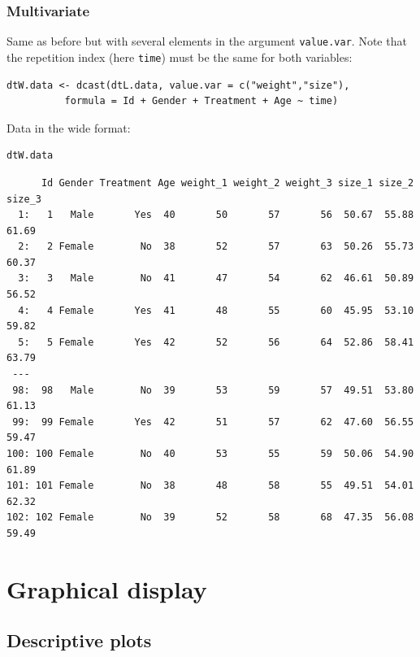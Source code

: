\documentclass{article}
\begin{document}
\clearpage

\subsubsection{Multivariate}
\label{sec:orgd8f36ba}


Same as before but with several elements in the argument
\texttt{value.var}. Note that the repetition index (here \texttt{time}) must be the
same for both variables:
\lstset{language=r,label= ,caption= ,captionpos=b,numbers=none}
\begin{lstlisting}
dtW.data <- dcast(dtL.data, value.var = c("weight","size"),
		  formula = Id + Gender + Treatment + Age ~ time)
\end{lstlisting}

Data in the wide format:
\lstset{language=r,label= ,caption= ,captionpos=b,numbers=none}
\begin{lstlisting}
dtW.data
\end{lstlisting}

\begin{verbatim}
      Id Gender Treatment Age weight_1 weight_2 weight_3 size_1 size_2 size_3
  1:   1   Male       Yes  40       50       57       56  50.67  55.88  61.69
  2:   2 Female        No  38       52       57       63  50.26  55.73  60.37
  3:   3   Male        No  41       47       54       62  46.61  50.89  56.52
  4:   4 Female       Yes  41       48       55       60  45.95  53.10  59.82
  5:   5 Female       Yes  42       52       56       64  52.86  58.41  63.79
 ---                                                                         
 98:  98   Male        No  39       53       59       57  49.51  53.80  61.13
 99:  99 Female       Yes  42       51       57       62  47.60  56.55  59.47
100: 100 Female        No  40       53       55       59  50.06  54.90  61.89
101: 101 Female        No  38       48       58       55  49.51  54.01  62.32
102: 102 Female        No  39       52       58       68  47.35  56.08  59.49
\end{verbatim}

\section{Graphical display}
\label{sec:org6fe8f58}
\subsection{Descriptive plots}
\label{sec:orga10309b}
\end{document}
